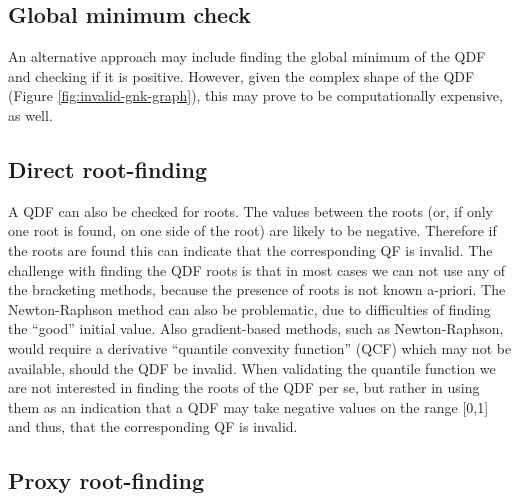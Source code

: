 \documentclass[ba]{imsart}
\numberwithin{equation}{section}
\theoremstyle{plain}
\begin{document}
\hypertarget{global-minimum-check}{%
\subsection{Global minimum check}\label{global-minimum-check}}

An alternative approach may include finding the global minimum of the QDF and checking if it is positive. However, given the complex shape of the QDF (Figure \ref{fig:invalid-gnk-graph}), this may prove to be computationally expensive, as well.

\hypertarget{direct-root-finding}{%
\subsection{Direct root-finding}\label{direct-root-finding}}

A QDF can also be checked for roots. The values between the roots (or, if only one root is found, on one side of the root) are likely to be negative. Therefore if the roots are found this can indicate that the corresponding QF is invalid. The challenge with finding the QDF roots is that in most cases we can not use any of the bracketing methods, because the presence of roots is not known a-priori. The Newton-Raphson method can also be problematic, due to difficulties of finding the ``good'' initial value. Also gradient-based methods, such as Newton-Raphson, would require a derivative ``quantile convexity function'' (QCF) which may not be available, should the QDF be invalid. When validating the quantile function we are not interested in finding the roots of the QDF per se, but rather in using them as an indication that a QDF may take negative values on the range {[}0,1{]} and thus, that the corresponding QF is invalid.

\hypertarget{proxy-root-finding}{%
\subsection{Proxy root-finding}\label{proxy-root-finding}}
\end{document}
